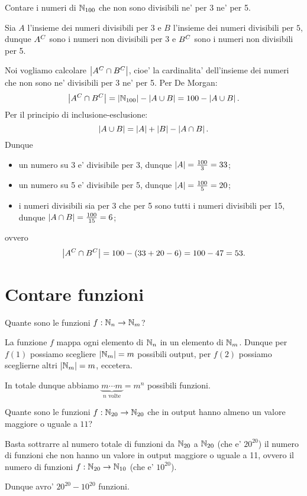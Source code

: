 \begin{example}
    Contare i numeri di $\mathbb{N}_{100}$ che non sono divisibili ne' per 3 ne' per 5.
\end{example}
\begin{solution}
    Sia $A$ l'insieme dei numeri divisibili per $3$ e $B$ l'insieme dei numeri divisibili per $5$, dunque $A^C$ sono i numeri non divisibili per 3 e $B^C$ sono i numeri non divisibili per 5.
    
    Noi vogliamo calcolare $\left|A^C \cap B^C\right|$, cioe' la cardinalita' dell'insieme dei numeri che non sono ne' divisibili per 3 ne' per 5.
    Per De Morgan: \[
        \left|A^C \cap B^C\right| = \left|\mathbb{N}_{100}\right| - \left|A \cup B\right| = 100 - \left|A \cup B\right|. 
    \] Per il principio di inclusione-esclusione: \[
        \left|A \cup B\right| = \left|A\right| + \left|B\right| - \left|A \cap B\right|. 
    \]
    Dunque \begin{itemize}
        \item un numero su 3 e' divisibile per 3, dunque $\left|A\right| = \frac{100}{3} = 33$;
        \item un numero su 5 e' divisibile per 5, dunque $\left|A\right| = \frac{100}{5} = 20$;
        \item i numeri divisibili sia per 3 che per 5 sono tutti i numeri divisibili per 15, dunque $\left|A \cap B\right| = \frac{100}{15} = 6$;
    \end{itemize}
    ovvero \[
        \left|A^C \cap B^C\right| = 100 - (33+20-6) = 100 - 47 = 53.
    \]
\end{solution}

\section{Contare funzioni}
\begin{example}
    Quante sono le funzioni $f : \mathbb{N}_n \to \mathbb{N}_m$?
\end{example}
\begin{solution}
    La funzione $f$ mappa ogni elemento di $\mathbb{N}_n$ in un elemento di $\mathbb{N}_m$. Dunque per $f(1)$ possiamo scegliere $\left|\mathbb{N}_m\right| = m$ possibili output, per $f(2)$ possiamo sceglierne altri $\left|\mathbb{N}_m\right| = m$, eccetera. 
    
    In totale dunque abbiamo $\underbrace{m \cdots m}_{n \text{ volte}} = m^n$ possibili funzioni.
\end{solution}

\begin{example}
    Quante sono le funzioni $f : \mathbb{N}_{20} \to \mathbb{N}_{20}$ che in output hanno almeno un valore maggiore o uguale a $11$?
\end{example}
\begin{solution}
    Basta sottrarre al numero totale di funzioni da $\mathbb{N}_{20}$ a $\mathbb{N}_{20}$ (che e' $20^{20}$) il numero di funzioni che non hanno un valore in output maggiore o uguale a 11, ovvero il numero di funzioni $f : \mathbb{N}_{20} \to \mathbb{N}_{10}$ (che e' $10^{20}$).


    Dunque avro' $20^{20} - 10^{20}$ funzioni.
\end{solution}

